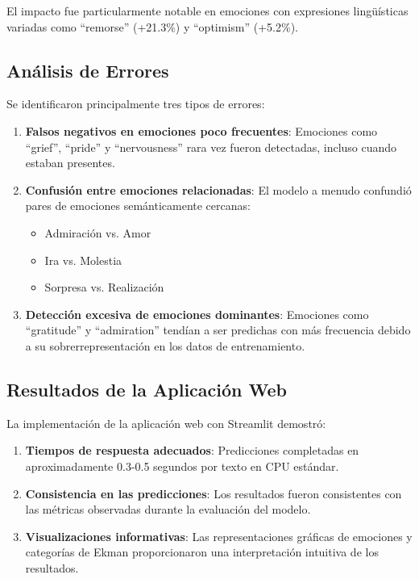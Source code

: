 \documentclass[12pt,a4paper]{report}
\begin{document}
El impacto fue particularmente notable en emociones con expresiones lingüísticas variadas como ``remorse'' (+21.3\%) y ``optimism'' (+5.2\%).

\subsection{Análisis de Errores}

Se identificaron principalmente tres tipos de errores:

\begin{enumerate}
  \item \textbf{Falsos negativos en emociones poco frecuentes}: Emociones como ``grief'', ``pride'' y ``nervousness'' rara vez fueron detectadas, incluso cuando estaban presentes.

  \item \textbf{Confusión entre emociones relacionadas}: El modelo a menudo confundió pares de emociones semánticamente cercanas:
  \begin{itemize}
    \item Admiración vs. Amor
    \item Ira vs. Molestia
    \item Sorpresa vs. Realización
  \end{itemize}

  \item \textbf{Detección excesiva de emociones dominantes}: Emociones como ``gratitude'' y ``admiration'' tendían a ser predichas con más frecuencia debido a su sobrerrepresentación en los datos de entrenamiento.
\end{enumerate}

\subsection{Resultados de la Aplicación Web}

La implementación de la aplicación web con Streamlit demostró:

\begin{enumerate}
  \item \textbf{Tiempos de respuesta adecuados}: Predicciones completadas en aproximadamente 0.3-0.5 segundos por texto en CPU estándar.

  \item \textbf{Consistencia en las predicciones}: Los resultados fueron consistentes con las métricas observadas durante la evaluación del modelo.

  \item \textbf{Visualizaciones informativas}: Las representaciones gráficas de emociones y categorías de Ekman proporcionaron una interpretación intuitiva de los resultados.
\end{enumerate}
\end{document}
